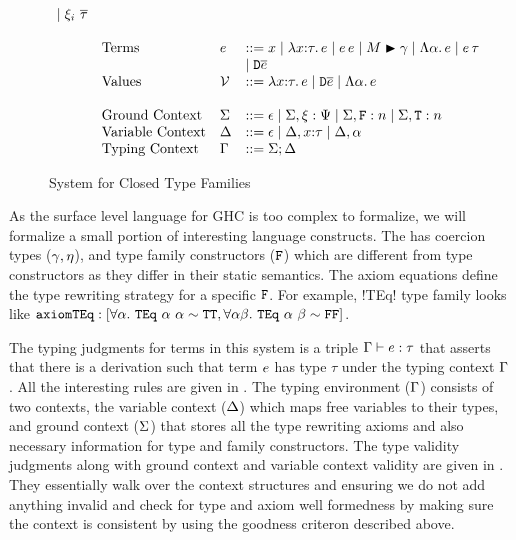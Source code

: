 \documentclass[format=acmsmall,manuscript,review,screen,nonacm,margin=1in,11pt]{acmart}
\begin{document}
\begin{figure}[ht]
\[\begin{array}{l l l l l}
                                        \mathrel{\mid} \xi_{i}~{\overline{\tau}} & \\
      \\
      &\text{Terms}      & e        &\mathrel{{:}{:}{=}} x \mathrel{\mid} \lambda x{:}\tau.\, e \mathrel{\mid} e\,e \mathrel{\mid}M\mathrel{\blacktriangleright}\gamma 
                                        \mathrel{\mid} \Lambda \alpha.\, e \mathrel{\mid} e\,\tau  \\
      &                  &            & \mathrel{\mid} \texttt{D}\overline{e} \\
      &\text{Values}     &\mathcal{V}        &\mathrel{{:}{:}{=}} \lambda x{:}\tau.\, e \mathrel{\mid} \texttt{D}\overline{e} \mathrel{\mid} \Lambda \alpha.\, e\\
      \\
      &\text{Ground Context} &\Sigma   &\mathrel{{:}{:}{=}} \epsilon \mathrel{\mid} \Sigma,\xi:\Psi
                                        \mathrel{\mid} \Sigma,\texttt{F}:n \mathrel{\mid} \Sigma,\texttt{T}:n\\
      &\text{Variable Context}&\Delta  &\mathrel{{:}{:}{=}} \epsilon \mathrel{\mid} \Delta,x{:}\tau \mathrel{\mid} \Delta,\alpha\\
      &\text{Typing Context}  &\Gamma  &\mathrel{{:}{:}{=}} \Sigma;\Delta\\
    \end{array}
  \]
  \caption[\CLTF{}]{System for Closed Type Families}
  \label{fig:syntax-tf-closed}
\end{figure}
As the surface level language for GHC is too complex to formalize, we will formalize a small portion
of interesting language constructs. The \CLTF has coercion types ($\gamma,\eta$), and 
type family constructors ($\texttt{F}$) which are different from type constructors as they differ in their
static semantics. The axiom equations define the type rewriting strategy for a specific $\texttt{F}$.
For example, !TEq! type family looks like $\texttt{axiomTEq}: [\forall\alpha.~{\texttt{TEq}~\alpha~\alpha} \mathrel{\sim} \texttt{TT}
, \forall\alpha\beta.~{\texttt{TEq}~\alpha~\beta} \mathrel{\sim} \texttt{FF}]$.

The typing judgments for terms in this system is a triple $\Gamma \vdash e : \tau$ that asserts that
there is a derivation such that term $e$ has type $\tau$ under the typing context $\Gamma$. All the interesting
rules are given in . The typing environment ($\Gamma$) consists of two contexts,
the variable context ($\Delta$) which maps free variables to their types, and ground context ($\Sigma$)
that stores all the type rewriting axioms and also necessary information for type and family constructors.
The type validity judgments along with ground context and variable context validity are given
in . They essentially walk over the context structures
and ensuring we do not add anything invalid and check for type and axiom well formedness by making sure
the context is consistent by using the goodness criteron described above.
\end{document}
